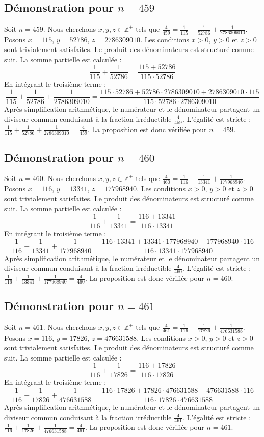 \documentclass[11pt,a4paper]{article}
\begin{document}
\subsection{Démonstration pour $n = 459$}
Soit $n = 459$. Nous cherchons $x, y, z \in \mathbb{Z}^{+}$ tels que $\frac{4}{459} = \frac{1}{115} + \frac{1}{52786} + \frac{1}{2786309010}$.
Posons $x = 115$, $y = 52786$, $z = 2786309010$.
Les conditions $x > 0$, $y > 0$ et $z > 0$ sont trivialement satisfaites.
Le produit des dénominateurs est structuré comme suit. La somme partielle est calculée :
$$ \frac{1}{115} + \frac{1}{52786} = \frac{115+52786}{115 \cdot 52786} $$
En intégrant le troisième terme :
$$ \frac{1}{115} + \frac{1}{52786} + \frac{1}{2786309010} = \frac{115 \cdot 52786 + 52786 \cdot 2786309010 + 2786309010 \cdot 115}{115 \cdot 52786 \cdot 2786309010} $$
Après simplification arithmétique, le numérateur et le dénominateur partagent un diviseur commun conduisant à la fraction irréductible $\frac{4}{459}$.
L'égalité est stricte : $\frac{1}{115} + \frac{1}{52786} + \frac{1}{2786309010} = \frac{4}{459}$.
La proposition est donc vérifiée pour $n = 459$.
\subsection{Démonstration pour $n = 460$}
Soit $n = 460$. Nous cherchons $x, y, z \in \mathbb{Z}^{+}$ tels que $\frac{4}{460} = \frac{1}{116} + \frac{1}{13341} + \frac{1}{177968940}$.
Posons $x = 116$, $y = 13341$, $z = 177968940$.
Les conditions $x > 0$, $y > 0$ et $z > 0$ sont trivialement satisfaites.
Le produit des dénominateurs est structuré comme suit. La somme partielle est calculée :
$$ \frac{1}{116} + \frac{1}{13341} = \frac{116+13341}{116 \cdot 13341} $$
En intégrant le troisième terme :
$$ \frac{1}{116} + \frac{1}{13341} + \frac{1}{177968940} = \frac{116 \cdot 13341 + 13341 \cdot 177968940 + 177968940 \cdot 116}{116 \cdot 13341 \cdot 177968940} $$
Après simplification arithmétique, le numérateur et le dénominateur partagent un diviseur commun conduisant à la fraction irréductible $\frac{4}{460}$.
L'égalité est stricte : $\frac{1}{116} + \frac{1}{13341} + \frac{1}{177968940} = \frac{4}{460}$.
La proposition est donc vérifiée pour $n = 460$.
\subsection{Démonstration pour $n = 461$}
Soit $n = 461$. Nous cherchons $x, y, z \in \mathbb{Z}^{+}$ tels que $\frac{4}{461} = \frac{1}{116} + \frac{1}{17826} + \frac{1}{476631588}$.
Posons $x = 116$, $y = 17826$, $z = 476631588$.
Les conditions $x > 0$, $y > 0$ et $z > 0$ sont trivialement satisfaites.
Le produit des dénominateurs est structuré comme suit. La somme partielle est calculée :
$$ \frac{1}{116} + \frac{1}{17826} = \frac{116+17826}{116 \cdot 17826} $$
En intégrant le troisième terme :
$$ \frac{1}{116} + \frac{1}{17826} + \frac{1}{476631588} = \frac{116 \cdot 17826 + 17826 \cdot 476631588 + 476631588 \cdot 116}{116 \cdot 17826 \cdot 476631588} $$
Après simplification arithmétique, le numérateur et le dénominateur partagent un diviseur commun conduisant à la fraction irréductible $\frac{4}{461}$.
L'égalité est stricte : $\frac{1}{116} + \frac{1}{17826} + \frac{1}{476631588} = \frac{4}{461}$.
La proposition est donc vérifiée pour $n = 461$.
\end{document}
